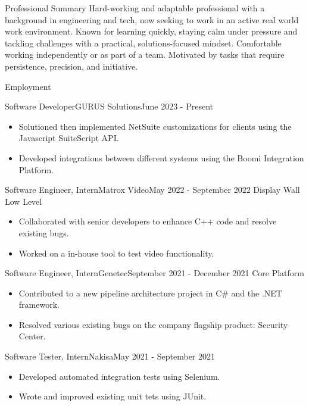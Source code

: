 \documentclass[]{mcdowellcv}
\begin{document}
	\makeheader


	\begin{cvsection}{Professional Summary}
	Hard-working and adaptable professional with a background in engineering and tech, now seeking to work in an active real world work environment. 
	Known for learning quickly, staying calm under pressure and tackling challenges with a practical, solutions-focused mindset.
	Comfortable working independently or as part of a team. Motivated by tasks that require persistence, precision, and initiative.

	\end{cvsection}
	
	\begin{cvsection}{Employment}
		\begin{cvsubsection}{Software Developer}{GURUS Solutions}{June 2023 - Present}
			\begin{itemize}
                \item Solutioned then implemented NetSuite customizations for clients using the Javascript SuiteScript API.
                \item Developed integrations between different systems using the Boomi Integration Platform.
			\end{itemize}
		\end{cvsubsection}

		\begin{cvsubsection}{Software Engineer, Intern}{Matrox Video}{May 2022 - September 2022}
		    Display Wall Low Level	
			\begin{itemize}
                \item Collaborated with senior developers to enhance C++ code and resolve existing bugs.
                \item Worked on a in-house tool to test video functionality.
			\end{itemize}
		\end{cvsubsection}
		
		\begin{cvsubsection}{Software Engineer, Intern}{Genetec}{September 2021 - December 2021}	
            Core Platform
			\begin{itemize}
                \item Contributed to a new pipeline architecture project in C\# and the .NET framework.
                \item Resolved various existing bugs on the company flagship product: Security Center.
			\end{itemize}
		\end{cvsubsection}
		
		\begin{cvsubsection}{Software Tester, Intern}{Nakisa}{May 2021 - September 2021}		
			\begin{itemize}
                \item Developed automated integration tests using Selenium.
                \item Wrote and improved existing unit tets using JUnit.
			\end{itemize}
		\end{cvsubsection}
	\end{cvsection}
	
\end{document}
